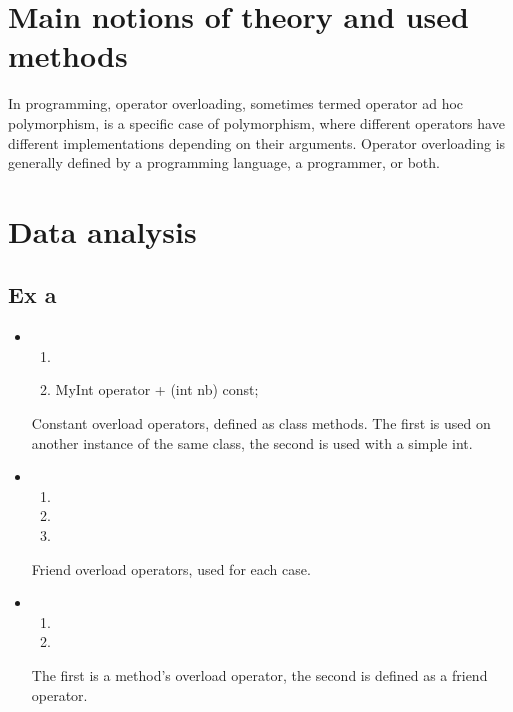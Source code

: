 \documentclass{article}
\begin{document}
	\section{Main notions of theory and used methods}
		In programming, operator overloading, sometimes termed operator ad hoc polymorphism, is a specific case of polymorphism, where different operators have different implementations depending on their arguments. Operator overloading is generally defined by a programming language, a programmer, or both.
	\pagebreak

	\section{Data analysis}
		\subsection{Ex a}
			

			\begin{itemize}
				\item
					\begin{enumerate}
						\item {}

						\item MyInt operator + (int nb) const;
					\end{enumerate}

					\par Constant overload operators, defined as class methods. The first is used on another instance of the same class, the second is used with a simple int.

				\item
					\begin{enumerate}
						\item {}
						\item {}
						\item {}
					\end{enumerate}
					\par Friend overload operators, used for each case.

				\item
					\begin{enumerate}
						\item {}
						\item {}
					\end{enumerate}
					\par The first is a method's overload operator, the second is defined as a friend operator.
			\end{itemize}
			\pagebreak
\end{document}
